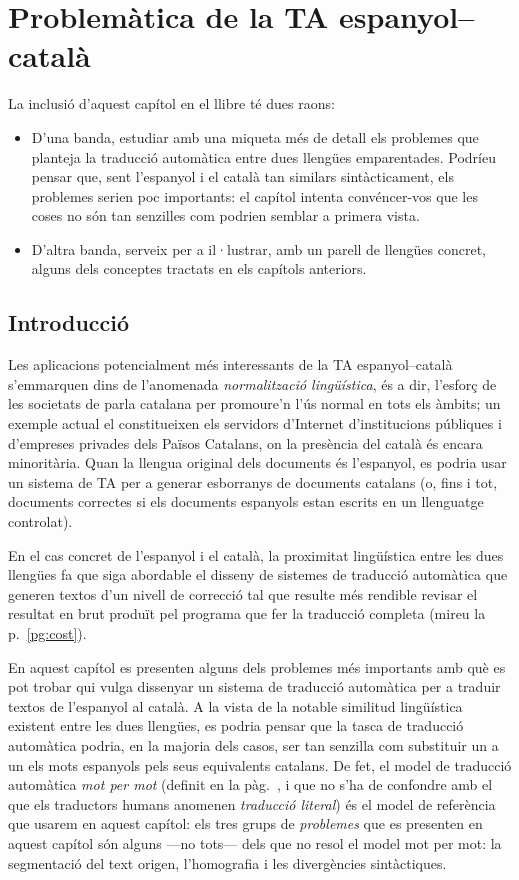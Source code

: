 \chapter{Problemàtica de la TA espanyol--català}
\label{se:PdTACC}

La inclusió d'aquest capítol en el llibre té dues raons:
\begin{itemize}
\item D'una banda, estudiar amb una miqueta més de detall els
  problemes que planteja la traducció automàtica entre dues llengües
  emparentades. Podríeu pensar que, sent l'espanyol i el català tan
  similars sintàcticament, els problemes serien poc importants: el
  capítol intenta convéncer-vos que les coses no són tan senzilles com
  podrien semblar a primera vista.
\item D'altra banda, serveix per a il·lustrar, amb un parell de
  llengües concret, alguns dels conceptes tractats en els capítols anteriors.
\end{itemize}




\section{Introducció}

Les aplicacions potencialment més interessants de la TA
espanyol--català s'em\-mar\-quen dins de l'anomenada {\em
  normalització lingüística}, és a dir, l'esforç de les societats
de parla catalana per promoure'n l'ús normal en tots els àmbits; un
exemple actual el constitueixen els servidors d'Internet
d'institucions públiques i d'empreses privades dels Països Catalans,
on la presència del català és encara minoritària. Quan la llengua
original dels documents és l'espanyol, es podria usar un sistema de
TA per a generar esborranys de documents catalans (o, fins i tot,
documents correctes si els documents espanyols estan escrits en un
llenguatge controlat).

En el cas concret de l'espanyol i el català, la proximitat lingüística
entre les dues llengües fa que siga abordable el disseny de sistemes
de traducció automàtica que generen textos d'un nivell de correcció
tal que resulte més rendible revisar el resultat en brut produït pel
programa que fer la traducció completa (mireu la p.~\ref{pg:cost}).


En aquest capítol es presenten alguns dels problemes més importants
amb què es pot trobar qui vulga dissenyar un sistema de traducció
automàtica per a traduir textos de l'espanyol al català. A la vista de
la notable similitud lingüística existent entre les dues llengües, es
podria pensar que la tasca de traducció automàtica podria, en la
majoria dels casos, ser tan senzilla com substituir un a un els mots
espanyols pels seus equivalents catalans. De fet, el model de
traducció automàtica \emph{mot per mot} (definit en la
pàg.~\pageref{pg:mpm}, i que no s'ha de confondre amb el que els
traductors humans anomenen \emph{traducció literal}) és el model de
referència que usarem en aquest capítol: els tres grups de {\em
  problemes} que es presenten en aquest capítol són alguns ---no
tots--- dels que no resol el model mot per mot: la segmentació del
text origen, l'homografia i les divergències sintàctiques.

